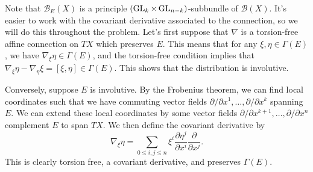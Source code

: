 \documentclass{../../templates/lkx_pset}
\begin{document}
\begin{solution}
  Note that $\mathscr{B}_E(X)$ is a principle $(\operatorname{GL}_k\times \operatorname{GL}_{n-k})$-subbundle of $\mathscr{B}(X)$.
  It's easier to work with the covariant derivative associated to the connection, so we will do this throughout the problem. Let's first suppose that $\nabla$ is a torsion-free affine connection on $TX$ which preserves $E$. This means that for any $\xi,\eta\in \Gamma(E)$, we have $\nabla_{\xi}\eta\in \Gamma(E)$, and the torsion-free condition implies that $\nabla_\xi \eta - \nabla_\eta \xi = [\xi,\eta]\in \Gamma(E)$. This shows that the distribution is involutive.

  Conversely, suppose $E$ is involutive. By the Frobenius theorem, we can find local coordinates such that we have commuting vector fields $\partial/\partial x^1,\ldots, \partial / \partial x^k$ spanning $E$. We can extend these local coordinates by some vector fields $\partial/\partial x^{k+1},\ldots, \partial/\partial x^n$ complement $E$ to span $TX$. We then define the covariant derivative by
  \[
    \nabla_\xi \eta = \sum_{0\leq i,j\leq n}\xi^i \frac{\partial \eta^j}{\partial x^i} \frac{\partial}{\partial x^j}.
  \]
  This is clearly torsion free, a covariant derivative, and preserves $\Gamma(E)$.


\end{solution}
\end{document}
